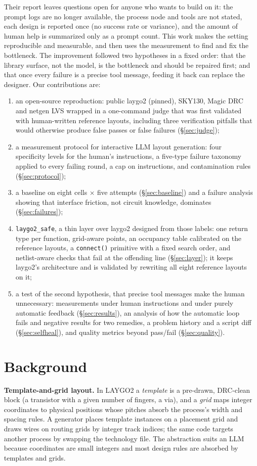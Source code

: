 \documentclass[conference]{IEEEtran}
\newcommand{\code}[1]{\texttt{#1}}
\begin{document}
Their report leaves questions open for anyone who wants to build on it: the prompt logs are no longer available, the process node and tools are not stated, each design is reported once (no success rate or variance), and the amount of human help is summarized only as a prompt count. This work makes the setting reproducible and measurable, and then uses the measurement to find and fix the bottleneck. The improvement followed two hypotheses in a fixed order: that the library surface, not the model, is the bottleneck and should be repaired first; and that once every failure is a precise tool message, feeding it back can replace the designer. Our contributions are:
\begin{enumerate}
\item an open-source reproduction: public laygo2 (pinned), SKY130, Magic DRC and netgen LVS wrapped in a one-command judge that was first validated with human-written reference layouts, including three verification pitfalls that would otherwise produce false passes or false failures (\S\ref{sec:judge});
\item a measurement protocol for interactive LLM layout generation: four specificity levels for the human's instructions, a five-type failure taxonomy applied to every failing round, a cap on instructions, and contamination rules (\S\ref{sec:protocol});
\item a baseline on eight cells $\times$ five attempts (\S\ref{sec:baseline}) and a failure analysis showing that interface friction, not circuit knowledge, dominates (\S\ref{sec:failures});
\item \code{laygo2\_safe}, a thin layer over laygo2 designed from those labels: one return type per function, grid-aware points, an occupancy table calibrated on the reference layouts, a \code{connect()} primitive with a fixed search order, and netlist-aware checks that fail at the offending line (\S\ref{sec:layer}); it keeps laygo2's architecture and is validated by rewriting all eight reference layouts on it;
\item a test of the second hypothesis, that precise tool messages make the human unnecessary: measurements under human instructions and under purely automatic feedback (\S\ref{sec:results}), an analysis of how the automatic loop fails and negative results for two remedies, a problem history and a script diff (\S\ref{sec:selfheal}), and quality metrics beyond pass/fail (\S\ref{sec:quality}).
\end{enumerate}

\section{Background}
\textbf{Template-and-grid layout.} In LAYGO2 a \emph{template} is a pre-drawn, DRC-clean block (a transistor with a given number of fingers, a via), and a \emph{grid} maps integer coordinates to physical positions whose pitches absorb the process's width and spacing rules. A generator places template instances on a placement grid and draws wires on routing grids by integer track indices; the same code targets another process by swapping the technology file. The abstraction suits an LLM because coordinates are small integers and most design rules are absorbed by templates and grids.
\end{document}
